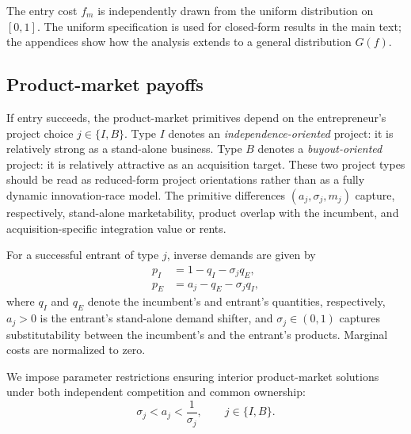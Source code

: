 The entry cost \(f_m\) is independently drawn from the uniform distribution on \([0,1]\).
The uniform specification is used for closed-form results in the main text; the appendices show how the analysis extends to a general distribution \(G(f)\).

\subsection{Product-market payoffs}

If entry succeeds, the product-market primitives depend on the entrepreneur's project choice \(j \in \{I,B\}\).
Type \(I\) denotes an \emph{independence-oriented} project: it is relatively strong as a stand-alone business.
Type \(B\) denotes a \emph{buyout-oriented} project: it is relatively attractive as an acquisition target.
These two project types should be read as reduced-form project orientations rather than as a fully dynamic innovation-race model.
The primitive differences \((a_j,\sigma_j,m_j)\) capture, respectively, stand-alone marketability, product overlap with the incumbent, and acquisition-specific integration value or rents.

For a successful entrant of type \(j\), inverse demands are given by
\begin{align}
    p_I &= 1 - q_I - \sigma_j q_E, \\
    p_E &= a_j - q_E - \sigma_j q_I,
\end{align}
where \(q_I\) and \(q_E\) denote the incumbent's and entrant's quantities, respectively,
\(a_j > 0\) is the entrant's stand-alone demand shifter, and \(\sigma_j \in (0,1)\) captures substitutability between the incumbent's and the entrant's products.
Marginal costs are normalized to zero.

We impose parameter restrictions ensuring interior product-market solutions under both independent competition and common ownership:
\begin{equation}\label{eq:interiorpm}
    \sigma_j < a_j < \frac{1}{\sigma_j},
    \qquad j \in \{I,B\}.
\end{equation}

